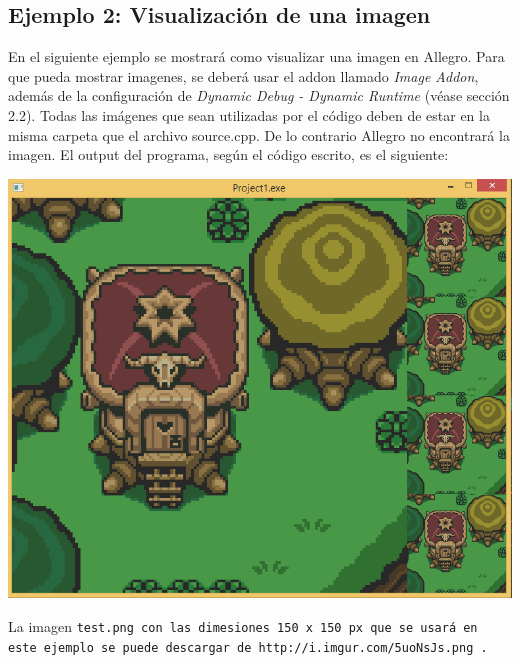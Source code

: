 \documentclass[11pt]{article}
\begin{document}
\subsection{Ejemplo 2:  Visualización de una imagen}
En el siguiente ejemplo se mostrará como visualizar una imagen en Allegro. Para que pueda mostrar imagenes, se deberá usar el addon llamado \emph{Image Addon}, además de la configuración de \emph{Dynamic Debug - Dynamic Runtime} (véase sección 2.2). Todas las imágenes que sean utilizadas por el código deben de estar en la misma carpeta que el archivo source.cpp. De lo contrario Allegro no encontrará la imagen. El output del programa, según el código escrito, es el siguiente:
\begin{center}
\includegraphics[scale=0.3]{SC12.png}
\end{center}
La imagen \tt test.png \rm con las dimesiones 150 x 150 px que se usará en este ejemplo se puede descargar de \tt http://i.imgur.com/5uoNsJs.png \rm .
\end{document}
